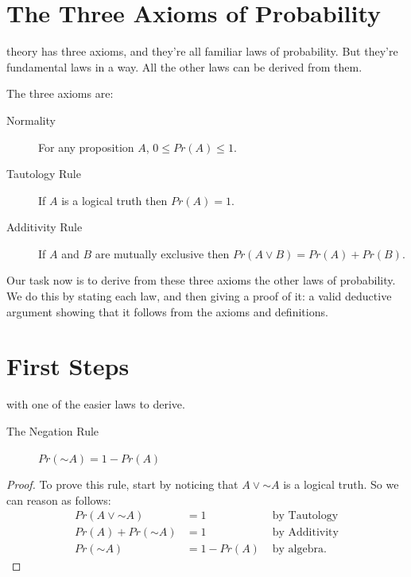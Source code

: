 \documentclass[justified]{tufte-book}
\renewcommand{\neg}{\mathbin{\sim}}
\newcommand{\p}{Pr}
\theoremstyle{definition}
\theoremstyle{definition}
\theoremstyle{definition}
\theoremstyle{remark}
\let\BeginKnitrBlock\begin \let\EndKnitrBlock\end
\begin{document}
\hypertarget{the-three-axioms-of-probability}{%
\section*{The Three Axioms of
Probability}\label{the-three-axioms-of-probability}}

 theory has three axioms, and they're all
familiar laws of probability. But they're fundamental laws in a way. All
the other laws can be derived from them.

The three axioms are:

\begin{description}
\item[Normality]
For any proposition \(A\), \(0 \leq \p(A) \leq 1\).
\item[Tautology Rule]
If \(A\) is a logical truth then \(\p(A) = 1\).
\item[Additivity Rule]
If \(A\) and \(B\) are mutually exclusive then
\(\p(A \vee B) = \p(A) + \p(B)\).
\end{description}

Our task now is to derive from these three axioms the other laws of
probability. We do this by stating each law, and then giving a proof of
it: a valid deductive argument showing that it follows from the axioms
and definitions.

\hypertarget{first-steps}{%
\section*{First Steps}\label{first-steps}}

 with one of the easier laws to derive.

\begin{description}
\item[The Negation Rule]
\(\p(\neg A) = 1 - \p(A)\)
\end{description}

\BeginKnitrBlock{proof}
{} To prove this rule, start by noticing that
\(A \vee \neg A\) is a logical truth. So we can reason as follows: \[
  \begin{aligned}
  \p(A \vee \neg A)  &= 1                 & \mbox{ by Tautology}\\
  \p(A) + \p(\neg A) &= 1                 & \mbox{ by Additivity}\\
  \p(\neg A)         &= 1 - \p(A)         & \mbox{ by algebra.}
  \end{aligned}
\]
\EndKnitrBlock{proof}
\end{document}
